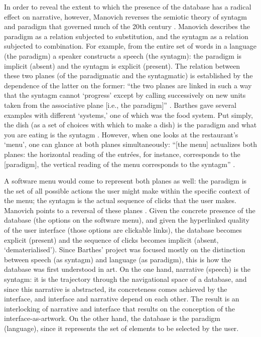 In order to reveal the extent to which the presence of the database has a radical effect on narrative, however, Manovich reverses the semiotic theory of syntagm and paradigm that governed much of the 20th century \parencite[231]{Man01:The}. Manovich describes the paradigm as a relation subjected to substitution, and the syntagm as a relation subjected to combination. For example, from the entire set of words in a language (the paradigm) a speaker constructs a speech (the syntagm): the paradigm is implicit (absent) and the syntagm is explicit (present). The relation between these two planes (of the paradigmatic and the syntagmatic) is established by the dependence of the latter on the former: ``the two planes are linked in such a way that the syntagm cannot `progress' except by calling successively on new units taken from the associative plane [i.e., the paradigm]'' \parencite[59]{Bar68:Ele}. Barthes gave several examples with different `systems,' one of which was the food system. Put simply, the dish (as a set of choices with which to make a dish) is the paradigm and what you are eating is the syntagm \parencite[63]{Bar68:Ele}. However, when one looks at the restaurant's `menu', one can glance at both planes simultaneously: ``[the menu] actualizes both planes: the horizontal reading of the entrées, for instance, corresponds to the [paradigm], the vertical reading of the menu corresponds to the syntagm'' \parencite[63]{Bar68:Ele}. 

A software menu would come to represent both planes as well: the paradigm is the set of all possible actions the user might make within the specific context of the menu; the syntagm is the actual sequence of clicks that the user makes. Manovich points to a reversal of these planes . Given the concrete presence of the database (the options on the software menu), and given the hyperlinked quality of the user interface (those options are clickable links), the database becomes explicit (present) and the sequence of clicks becomes implicit (absent, `dematerialised'). Since Barthes' project was focused mostly on the distinction between speech (as syntagm) and language (as paradigm), this is how the database was first understood in art. On the one hand, narrative (speech) is the syntagm: it is the trajectory through the navigational space of a database, and since this narrative is abstracted, its concreteness comes achieved by the interface, and interface and narrative depend on each other. The result is an interlocking of narrative and interface that results on the conception of the interface-as-artwork. On the other hand, the database is the paradigm (language), since it represents the set of elements to be selected by the user.

